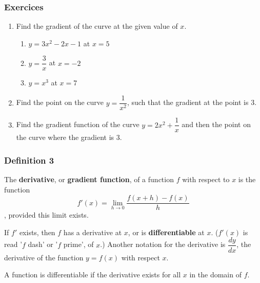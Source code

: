 \documentclass[11pt]{article}
\begin{document}
\subsubsection{Exercices}
\label{sec:orgf53ca17}

\begin{enumerate}
\item Find the gradient of the curve at the given value of \(x\).
\begin{enumerate}
\item \(y = 3x^2 - 2x - 1\) at \(x = 5\)
\item \(y = \dfrac{3}{x}\) at \(x = -2\)
\item \(y = x^3\) at \(x = 7\)
\end{enumerate}
\item Find the point on the curve \(y = \dfrac{1}{x^2}\), such that the
gradient at the point is 3.
\item Find the gradient function of the curve \(y = 2x^2 +
       \dfrac{1}{x}\) and then the point on the curve where the
gradient is 3.
\end{enumerate}

\subsubsection{Definition 3}
\label{sec:org0c4a22d}

The \textbf{derivative}, or \textbf{gradient function}, of a function \(f\) with
respect to \(x\) is the function \[f'(x) = \lim_{h\to
    0}\dfrac{f(x+h)-f(x)}{h}\], provided this limit exists.

If \(f'\) exists, then \(f\) has a derivative at \(x\), or is
\textbf{differentiable} at \(x\). (\(f'(x)\) is read '\(f\) dash' or '\(f\)
prime', of \(x\).) Another notation for the derivative is
\(\dfrac{dy}{dx}\), the derivative of the function \(y = f(x)\) with
respect \(x\).

A function is differentiable if the derivative exists for all \(x\)
in the domain of \(f\).
\end{document}

